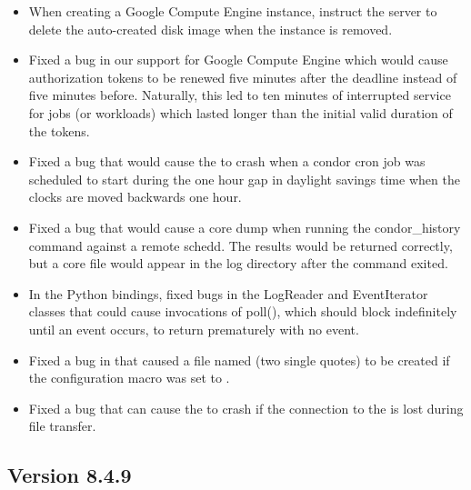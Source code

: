 \begin{itemize}

\item When creating a Google Compute Engine instance, instruct the server
to delete the auto-created disk image when the instance is removed.

\item Fixed a bug in our support for Google Compute Engine which would
cause authorization tokens to be renewed five minutes after the deadline
instead of five minutes before.  Naturally, this led to ten minutes of
interrupted service for jobs (or workloads) which lasted longer than the
initial valid duration of the tokens.

\item Fixed a bug that would cause the  to crash when a
condor cron job was scheduled to start during the one hour gap in daylight
savings time when the clocks are moved backwards one hour.

\item Fixed a bug that would cause a core dump when running the condor\_history
command against a remote schedd.  The results would be returned correctly, but a 
core file would appear in the log directory after the command exited.

\item In the Python bindings, fixed bugs in the LogReader and EventIterator
classes that could cause invocations of poll(), which should block
indefinitely until an event occurs, to return prematurely with no event.

\item Fixed a bug in  that caused a file named
 (two single quotes) to be created if the
 configuration macro was set
to .

\item Fixed a bug that can cause the  to crash if the
connection to the  is lost during file transfer.

\end{itemize}

\subsection*{\label{sec:New-8-4-9}Version 8.4.9}

